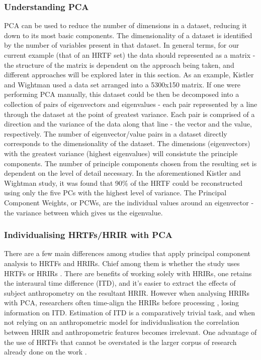 \subsubsection{Understanding PCA}
PCA can be used to reduce the number of dimensions in a dataset, reducing it down to its most basic components. The dimensionality of a dataset is identified by the number of variables present in that dataset. In general terms, for our current example (that of an HRTF set) the data should represented as a matrix - the structure of the matrix is dependent on the approach being taken, and different approaches will be explored later in this section. As an example, Kistler and Wightman \citep{Kistler1992} used a data set arranged into a 5300x150 matrix. If one were performing PCA manually, this dataset could be then be decomposed into a collection of pairs of eigenvectors and eigenvalues - each pair represented by a line through the dataset at the point of greatest variance. Each pair is comprised of a direction and the variance of the data along that line - the vector and the value, respectively. The number of eigenvector/value pairs in a dataset directly corresponds to the dimensionality of the dataset. The dimensions (eigenvectors) with the greatest variance (highest eigenvalues) will consistute the principle components. The number of principle components chosen from the resulting set is dependent on the level of detail necessary. In the aforementioned Kistler and Wightman study, it was found that 90\% of the HRTF could be reconstructed using only the five PCs with the highest level of variance. The Principal Component Weights, or PCWs, are the individual values around an eigenvector - the variance between which gives us the eigenvalue.


\subsubsection{Individualising HRTFs/HRIR with PCA}
There are a few main differences among studies that apply principal component analysis to HRTFs and HRIRs. Chief among them is whether the study uses HRTFs \citep{Holzl2014a} \citep{Gutierrez-Parera2017} or HRIRs \citep{Hwang2008} \citep{Hwang2007} \citep{Fink2012}. There are benefits of working solely with HRIRs, one retains the interaural time difference (ITD), and it's easier to extract the effects of subject anthropometry on the resultant HRIR. However when analysing HRIRs with PCA, researchers often time-align the HRIRs before processing \citep{hwang2010customization}, losing information on ITD. Estimation of ITD is a comparatively trivial task, and when not relying on an anthropometric model for individualisation the correlation between HRIR and anthropometric features becomes irrelevant. One advantage of the use of HRTFs that cannot be overstated is the larger corpus of research already done on the work \citep{Holzl2014a}. 

